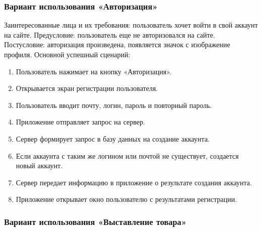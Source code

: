 \subsubsection{Вариант использования «Авторизация»}

Заинтересованные лица и их требования: пользователь хочет войти в свой аккаунт на сайте.
Предусловие: пользователь еще не авторизовался на сайте.
Постусловие: авторизация произведена, появляется значок с изображение профиля.
Основной успешный сценарий:
\begin{enumerate}
	\item Пользователь нажимает на кнопку «Авторизация».
	\item Открывается экран регистрации пользователя.
	\item Пользователь вводит почту, логин, пароль и повторный пароль.
	\item Приложение отправляет запрос на сервер.
	\item Сервер формирует запрос в базу данных на создание аккаунта.
	\item Если аккаунта с таким же логином или почтой не существует, создается новый аккаунт.
	\item Сервер передает информацию в приложение о результате создания аккаунта.
	\item Приложение открывает окно пользователю с результатами регистрации.
\end{enumerate}

\subsubsection{Вариант использования «Выставление товара»}

